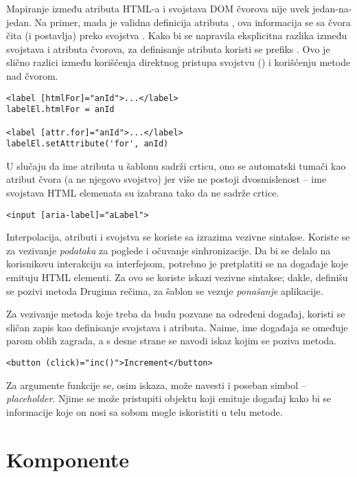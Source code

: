 Mapiranje između atributa HTML-a i svojstava DOM čvorova nije uvek jedan-na-jedan.
Na primer, mada je  validna definicija atributa , ova informacija se sa čvora čita (i postavlja) preko svojstva .
Kako bi se napravila eksplicitna razlika između svojstava i atributa čvorova, za definisanje atributa koristi se prefiks .
Ovo je slično razlici između korišćenja direktnog pristupa svojstvu () i korišćenju metode  nad čvorom.

\begin{verbatim}
<label [htmlFor]="anId">...</label>
labelEl.htmlFor = anId

<label [attr.for]="anId">...</label>
labelEl.setAttribute('for', anId)
\end{verbatim}

U slučaju da ime atributa u šablonu sadrži crticu, ono se automatski tumači kao atribut čvora (a ne njegovo svojstvo) jer više ne postoji dvosmislenost -- ime svojstava HTML elemenata su izabrana tako da ne sadrže crtice.

\begin{verbatim}
<input [aria-label]="aLabel">
\end{verbatim}

Interpolacija, atributi i svojstva se koriste sa izrazima vezivne sintakse.
Koriste se za vezivanje \emph{podataka} za poglede i očuvanje sinhronizacije.
Da bi se delalo na korisnikovu interakciju sa interfejsom, potrebno je pretplatiti se na događaje koje emituju HTML elementi.
Za ovo se koriste iskazi vezivne sintakse; dakle, definišu se pozivi metoda
Drugima rečima, za šablon se vezuje \emph{ponašanje} aplikacije.

Za vezivanje metoda koje treba da budu pozvane na određeni događaj, koristi se sličan zapis kao definisanje svojstava i atributa.
Naime, ime događaja se omeđuje parom oblih zagrada, a s desne strane se navodi iskaz kojim se poziva metoda.

\begin{verbatim}
<button (click)="inc()">Increment</button>
\end{verbatim}

Za argumente funkcije se, osim iskaza, može navesti i poseban simbol \code{\#} -- \textsl{placeholder}.
Njime se može pristupiti objektu koji emituje događaj kako bi se informacije koje on nosi sa sobom mogle iskoristiti u telu metode.

\section{Komponente}

